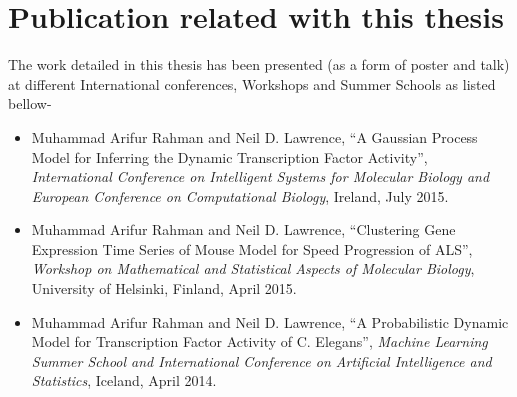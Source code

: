 % 
% 
% 

\section{Publication related with this thesis}
The work detailed in this thesis has been presented (as a form of poster and talk) at different International conferences, Workshops and Summer Schools as listed bellow-

\begin{itemize}
\item Muhammad Arifur Rahman and Neil D. Lawrence, ``A Gaussian Process Model for Inferring the Dynamic Transcription Factor Activity'', \textit{International Conference on Intelligent Systems for Molecular Biology and European Conference on Computational Biology}, Ireland, July 2015. 
\item Muhammad Arifur Rahman and Neil D. Lawrence, ``Clustering Gene Expression Time Series of Mouse Model for Speed Progression of ALS'', \textit{Workshop on Mathematical and Statistical Aspects of Molecular Biology}, University of Helsinki, Finland, April 2015.
\item Muhammad Arifur Rahman and Neil D. Lawrence, ``A Probabilistic Dynamic Model for Transcription Factor Activity of C. Elegans'', \textit{Machine Learning Summer School and  International Conference on Artificial Intelligence and Statistics}, Iceland, April 2014.
\end{itemize}

